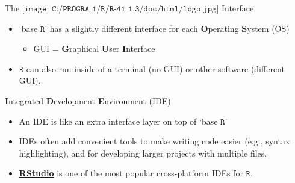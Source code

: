 \documentclass[
  ignorenonframetext,
]{beamer}
\providecommand{\tightlist}{%
  \setlength{\itemsep}{0pt}\setlength{\parskip}{0pt}}
\begin{document}
\begin{frame}{The
\(\texttt{[image: C:/PROGRA~1/R/R-41~1.3/doc/html/logo.jpg]}\)
Interface}
\protect\hypertarget{the-includegraphicsheight1emcprogra1rr-411.3dochtmllogo.jpg-interface}{}
\begin{itemize}
\tightlist
\item
  `base \(\texttt{R}\)' has a slightly different interface for each
  \textbf{O}perating \textbf{S}ystem (OS)

  \begin{itemize}
  \tightlist
  \item
    GUI = \textbf{G}raphical \textbf{U}ser \textbf{I}nterface
  \end{itemize}
\item
  \(\texttt{R}\) can also run inside of a terminal (no GUI) or other
  software (different GUI).
\end{itemize}

\begin{block}{\href{https://en.wikipedia.org/wiki/Integrated_development_environment}{\textbf{I}ntegrated
\textbf{D}evelopment \textbf{E}nvironment} (IDE)}
\protect\hypertarget{integrated-development-environment-ide}{}
\begin{itemize}
\tightlist
\item
  An IDE is like an extra interface layer on top of `base
  \(\texttt{R}\)'
\item
  IDEs often add convenient tools to make writing code easier (e.g.,
  syntax highlighting), and for developing larger projects with multiple
  files.
\item
  \textbf{\href{https://posit.co/products/open-source/rstudio/}{RStudio}}
  is one of the most popular cross-platform IDEs for \(\texttt{R}\).

\end{itemize}
\end{block}
\end{frame}
\end{document}
